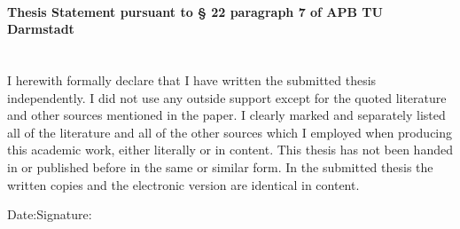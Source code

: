 \vspace{11pt}
\paragraph{Thesis Statement pursuant to § 22 paragraph 7 of APB TU Darmstadt}\noindent\\
I herewith formally declare that I have written the submitted thesis independently. I did not use any outside support except for the quoted literature and other sources mentioned in the paper. I clearly marked and separately listed all of the literature and all of the other sources which I employed when producing this academic work, either literally or in content. This thesis has not been handed in or published before in the same or similar form.\newline
In the submitted thesis the written copies and the electronic version are identical in content.\vspace{40pt}

\noindent Date:\hspace{0.4\textwidth}Signature:
\vspace*{2cm}